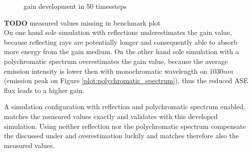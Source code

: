 \begin{figure}[H]
  \centerline{
    }
  \caption{gain development in 50 timessteps}
  \label{plot:benchmark}
\end{figure}
\textbf{TODO} measured values missing in benchmark plot\\

On one hand sole simulation with reflections underestimates the gain value,
because reflecting rays are potentially longer and consequently able
to absorb more energy from the gain medium. 
On the other hand sole simulation with a polychromatic spectrum overestimates the
gain value, because the average emission intensity is lower then with monochromatic
wavelength on $1030 nm$ (emission peak on Figure \ref{plot:polychromatic_spectrum}), 
thus the reduced  ASE flux leads to a higher gain.

A simulation configuration with reflection and polychromatic spectrum enabled,
matches the measured values exactly and validates with this developed simulation.
Using neither reflection nor the polychromatic spectrum compensate the discussed 
under and overestimation luckily and matches therefore also the measured 
values.

